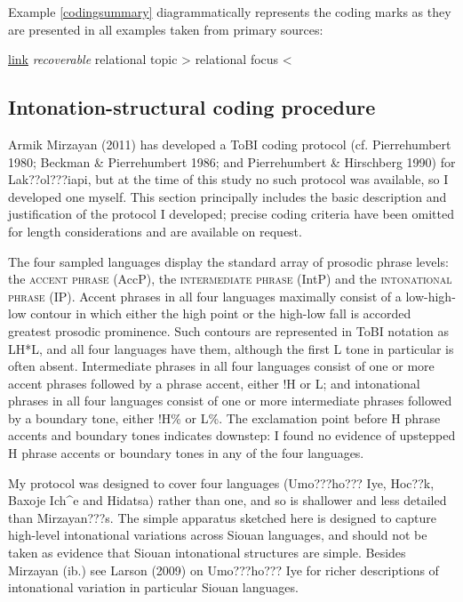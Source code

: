 \documentclass[output=paper]{LSP/langsci}
\begin{document}
Example \ref{codingsummary} diagrammatically represents the coding marks as they are presented in all examples taken from primary sources:

\ea\label{codingsummary}{\underline{link} \textit{recoverable} relational topic > relational focus <}\z

\subsection{Intonation-structural coding procedure}\label{intonationcoding}

Armik Mirzayan (2011) has developed a ToBI coding protocol (cf. Pierrehumbert 1980; Beckman \& Pierrehumbert 1986; and Pierrehumbert \& Hirschberg 1990) for Lak??ol???iapi, but at the time of this study no such protocol was available, so I developed one myself. This section principally includes the basic description and justification of the protocol I developed; precise coding criteria have been omitted for length considerations and are available on request. 

The four sampled languages display the standard array of prosodic phrase levels: the \textsc{accent phrase} (AccP), the \textsc{intermediate phrase} (IntP) and the \textsc{intonational phrase} (IP). Accent phrases in all four languages maximally consist of a low-high-low contour in which either the high point or the high-low fall is accorded greatest prosodic prominence. Such contours are represented in ToBI notation as LH*L, and all four languages have them, although the first L tone in particular is often absent. Intermediate phrases in all four languages consist of one or more accent phrases followed by a phrase accent, either !H or L; and intonational phrases in all four languages consist of one or more intermediate phrases followed by a boundary tone, either !H\% or L\%. The exclamation point before H phrase accents and boundary tones indicates downstep: I found no evidence of upstepped H phrase accents or boundary tones in any of the four languages. 

My protocol was designed to cover four languages (Umo???ho??? Iye, Hoc??k, Baxoje Ich\^{}e and Hidatsa) rather than one, and so is shallower and less detailed than Mirzayan???s. The simple apparatus sketched here is designed to capture high-level intonational variations across Siouan languages, and should not be taken as evidence that Siouan intonational structures are simple. Besides Mirzayan (ib.) see Larson (2009) on Umo???ho??? Iye for richer descriptions of intonational variation in particular Siouan languages. 
\end{document}
